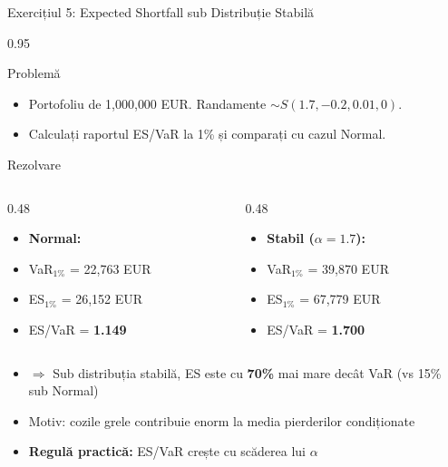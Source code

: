 \documentclass[9pt, aspectratio=169, t]{beamer}
\begin{document}
\begin{frame}{Exercițiul 5: Expected Shortfall sub Distribuție Stabilă}
    \begin{cminipage}{0.95\textwidth}
\begin{block}{Problemă}
\begin{itemize}\setlength{\itemsep}{0pt}
    \item Portofoliu de 1{,}000{,}000 EUR. Randamente $\sim S(1.7, -0.2, 0.01, 0)$.
    \item Calculați raportul ES/VaR la 1\% și comparați cu cazul Normal.
\end{itemize}
\end{block}

\begin{exampleblock}{Rezolvare}
\begin{columns}[T]
\begin{column}{0.48\textwidth}
\begin{itemize}\setlength{\itemsep}{0pt}
    \item \textbf{Normal:}
    \item VaR$_{1\%}$ = 22{,}763 EUR
    \item ES$_{1\%}$ = 26{,}152 EUR
    \item ES/VaR = \textbf{1.149}
\end{itemize}
\end{column}
\begin{column}{0.48\textwidth}
\begin{itemize}\setlength{\itemsep}{0pt}
    \item \textbf{Stabil ($\alpha = 1.7$):}
    \item VaR$_{1\%}$ = 39{,}870 EUR
    \item ES$_{1\%}$ = 67{,}779 EUR
    \item ES/VaR = \textbf{1.700}
\end{itemize}
\end{column}
\end{columns}

\vspace{0.2cm}
\begin{itemize}\setlength{\itemsep}{0pt}
    \item $\Rightarrow$ Sub distribuția stabilă, ES este cu \textbf{70\%} mai mare decât VaR (vs 15\% sub Normal)
    \item Motiv: cozile grele contribuie enorm la media pierderilor condiționate
    \item \textbf{Regulă practică:} ES/VaR crește cu scăderea lui $\alpha$
\end{itemize}
\end{exampleblock}
    \end{cminipage}
\end{frame}
\end{document}
